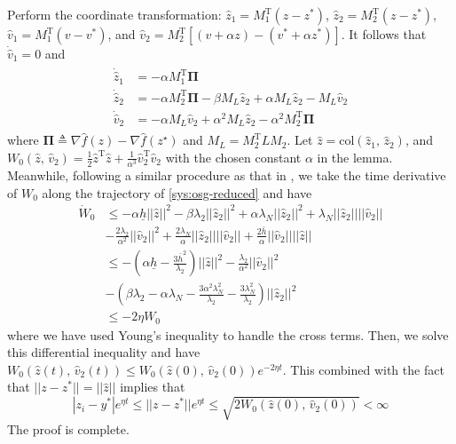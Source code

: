 \documentclass[sort&compress]{IEEEtran}
\renewcommand{\top}{{\mathrm{T}}}
\begin{document}
Perform the coordinate transformation: $\hat z_1=M_1^\top (z-z^*)$, $\hat z_2=M_2^\top (z-z^*)$, $\hat v_1=M_1^\top (v-v^*)$, and $\hat v_2=M_2^\top[( v+\alpha z)-( v^*+\alpha z^*)]$. It follows that $\dot{\hat v}_1= 0$ and  
\begin{align}\label{sys:osg-reduced}
	\begin{split}
		\dot{\hat z}_1&=-\alpha M_1^\top {\bm \Pi}\\
		\dot{\hat z}_2&=-\alpha M_2^\top {\bm \Pi}-\beta M_L \hat z_2 + \alpha M_L \hat z_2-M_L\hat v_2\\
		\dot{\hat v}_2&=-\alpha M_L {\hat v}_2+\alpha^2 M_L \hat z_2-\alpha^2 M_2^\top {\bm \Pi} 
	\end{split}
\end{align}
where ${\bm \Pi}\triangleq \nabla \hat f(z)-\nabla \hat f(z^\star)$ and $M_L=M_2^\top LM_2$.  Let $\hat z=\mbox{col}(\hat z_1,\,\hat z_2)$, and $W_0(\hat z,\,\hat v_2)=\frac{1}{2}\hat z^\top \hat z +\frac{1}{\alpha^3}\hat v_2^\top \hat v_2$ with the chosen constant $\alpha$ in the lemma. %
Meanwhile, following a similar procedure as that in \cite{tang2021optimal}, we take the time derivative of $W_0$ along the trajectory of \eqref{sys:osg-reduced} and have
\begin{align*}
	\dot{W}_0&\leq -\alpha\underline{h}||\hat z||^2- \beta\lambda_2||\hat z_2||^2+ \alpha  \lambda_N  ||\hat z_2||^2+ \lambda_N  ||\hat z_2||||\hat v_2||\\
	&-\frac{2\lambda_2}{\alpha^2}||\hat v_2||^2+ \frac{2\lambda_N}{\alpha}  ||\hat z_2|| ||\hat v_2||+\frac{2\bar h}{\alpha}||\hat v_2||||\hat z||\\
	&\leq -(\alpha\underline{h} -\frac{3\bar h^2}{\lambda_2} )||\hat z||^2-\frac{\lambda_2}{\alpha^2}||\hat v_2||^2\\
	& - (\beta\lambda_2-\alpha\lambda_N-\frac{3\alpha^2\lambda_N^2}{\lambda_2}-\frac{3\lambda_N^2}{\lambda_2})||\hat z_2||^2\\
	&\leq -2\eta W_0
\end{align*}
where we have used Young's inequality to handle the cross terms. Then, we solve this differential inequality and have $W_0(\hat z(t),\,\hat v_2(t))\leq W_0(\hat z(0),\,\hat v_2(0))e^{-2\eta t}$. This combined with the fact that $||z-z^*||=||\hat z|| $ implies that $$|z_i-y^*|e^{\eta t}\leq ||z-z^*||e^{\eta t}\leq  \sqrt{2W_0(\hat z(0),\,\hat v_2(0))}<\infty$$ The proof is complete.
\end{document}
